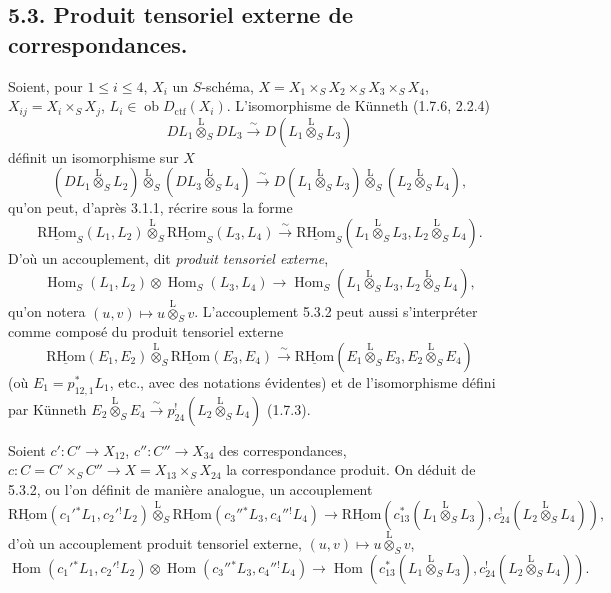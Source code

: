 \documentclass[11pt]{article}
\DeclareMathOperator{\Hom}{Hom}
\newcommand{\R}{\mathrm{R}}\newcommand{\RHomCore}{\mathrm{RHom}}
\providecommand{\RHom}{\RHomCore}
\providecommand{\uRHom}{\underline{\RHom}}
\providecommand{\RHom}{\RHomCore}
\providecommand{\Hom}{\operatorname{Hom}}
\providecommand{\RHom}{\R\mathcal{H}om}
\providecommand{\R}{\mathrm R}
\providecommand{\RHom}{\RHomCore}
\providecommand{\Hom}{\operatorname{Hom}}
\begin{document}
\subsection*{5.3. Produit tensoriel externe de correspondances.}

Soient, pour $1\leq i\leq 4$, $X_i$ un $S$-schéma, $X=X_1\times_SX_2\times_SX_3\times_SX_4$, $X_{ij}=X_i\times_SX_j$, $L_i\in\operatorname{ob}D_{\mathrm{ctf}}(X_i)$. L'isomorphisme de Künneth (1.7.6, 2.2.4)
\[
DL_1\overset{\mathrm{L}}{\otimes}_SDL_3\xrightarrow{\sim}D(L_1\overset{\mathrm{L}}{\otimes}_SL_3)
\]
définit un isomorphisme sur $X$
\begin{equation}
\tag{5.3.1}
(DL_1\overset{\mathrm{L}}{\otimes}_SL_2)\overset{\mathrm{L}}{\otimes}_S(DL_3\overset{\mathrm{L}}{\otimes}_SL_4)
\xrightarrow{\sim}D(L_1\overset{\mathrm{L}}{\otimes}_SL_3)\overset{\mathrm{L}}{\otimes}_S(L_2\overset{\mathrm{L}}{\otimes}_SL_4),
\end{equation}
qu'on peut, d'après 3.1.1, récrire sous la forme
\begin{equation}
\tag{5.3.2}
\uRHom_S(L_1,L_2)\overset{\mathrm{L}}{\otimes}_S\uRHom_S(L_3,L_4)
\xrightarrow{\sim}\uRHom_S(L_1\overset{\mathrm{L}}{\otimes}_SL_3,L_2\overset{\mathrm{L}}{\otimes}_SL_4).
\end{equation}
D'où un accouplement, dit \emph{produit tensoriel externe},
\begin{equation}
\tag{5.3.3}
\Hom_S(L_1,L_2)\otimes\Hom_S(L_3,L_4)
\longrightarrow\Hom_S(L_1\overset{\mathrm{L}}{\otimes}_SL_3,L_2\overset{\mathrm{L}}{\otimes}_SL_4),
\end{equation}
qu'on notera $(u,v)\mapsto u\overset{\mathrm{L}}{\otimes}_Sv$. L'accouplement 5.3.2 peut aussi s'interpréter comme composé du produit tensoriel externe
\[
\uRHom(E_1,E_2)\overset{\mathrm{L}}{\otimes}_S\uRHom(E_3,E_4)
\xrightarrow{\sim}\uRHom(E_1\overset{\mathrm{L}}{\otimes}_SE_3,E_2\overset{\mathrm{L}}{\otimes}_SE_4)
\]
(où $E_1=p_{12,1}^*L_1$, etc., avec des notations évidentes) et de l'isomorphisme défini par Künneth $E_2\overset{\mathrm{L}}{\otimes}_SE_4\xrightarrow{\sim}p_{24}^!(L_2\overset{\mathrm{L}}{\otimes}_SL_4)$ (1.7.3).

Soient $c':C'\to X_{12}$, $c'':C''\to X_{34}$ des correspondances, $c:C=C'\times_SC''\to X=X_{13}\times_SX_{24}$ la correspondance produit. On déduit de 5.3.2, ou l'on définit de manière analogue, un accouplement
\begin{equation}
\tag{5.3.4}
\uRHom(c_1'{}^*L_1,c_2'{}^!L_2)\overset{\mathrm{L}}{\otimes}_S\uRHom(c_3''{}^*L_3,c_4''{}^!L_4)
\longrightarrow\uRHom(c_{13}^*(L_1\overset{\mathrm{L}}{\otimes}_SL_3),c_{24}^!(L_2\overset{\mathrm{L}}{\otimes}_SL_4)),
\end{equation}
d'où un accouplement produit tensoriel externe, $(u,v)\mapsto u\overset{\mathrm{L}}{\otimes}_Sv$,
\begin{equation}
\tag{5.3.5}
\Hom(c_1'{}^*L_1,c_2'{}^!L_2)\otimes\Hom(c_3''{}^*L_3,c_4''{}^!L_4)
\longrightarrow\Hom(c_{13}^*(L_1\overset{\mathrm{L}}{\otimes}_SL_3),c_{24}^!(L_2\overset{\mathrm{L}}{\otimes}_SL_4)).
\end{equation}
\end{document}
